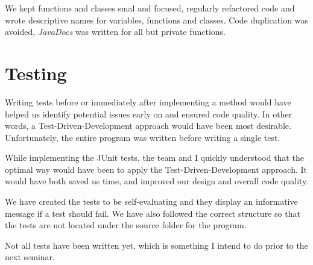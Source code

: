 \documentclass[a4paper]{scrreprt}
\begin{document}
We kept functions and classes smal and focused, regularly refactored code and wrote descriptive names for
variables, functions and classes.
Code duplication was avoided, \emph{JavaDocs} was written for all but private functions.

\section*{Testing}
\label{sec:testing}
Writing tests before or immediately after implementing a method would have helped us identify
potential issues early on and ensured code quality.
In other words, a Test-Driven-Development approach would have been most desirable.
Unfortunately, the entire program was written before writing a single test.

While implementing the JUnit tests, the team and I quickly understood that
the optimal way would have been to apply the Test-Driven-Development approach.
It would have both saved us time, and improved our design and overall code quality.

We have created the tests to be self-evaluating and they display an informative message
if a test should fail.
We have also followed the correct structure so that the
tests are not located under the source folder for the program.

Not all tests have been written yet, which is something I intend to do prior to the next seminar.
\end{document}
